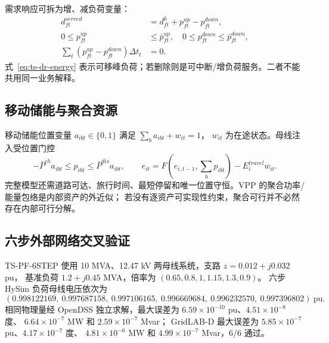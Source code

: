 需求响应可拆为增、减负荷变量：
\begin{align}
d_{ft}^{served}&=d_{ft}^0+p_{ft}^{up}-p_{ft}^{down},\label{eq:ts-dr}\\
0\le p_{ft}^{up}&\le\bar p_{ft}^{up},\quad0\le p_{ft}^{down}\le\bar p_{ft}^{down},\\
\sum_t(p_{ft}^{up}-p_{ft}^{down})\Delta t_t&=0.\label{eq:ts-dr-energy}
\end{align}
式~\eqref{eq:ts-dr-energy} 表示可移峰负荷；若删除则是可中断/增负荷服务。二者不能共用同一业务解释。

\subsection{移动储能与聚合资源}
移动储能位置变量 $a_{ibt}\in\{0,1\}$ 满足 $\sum_ba_{ibt}+w_{it}=1$，
$w_{it}$ 为在途状态。母线注入受位置门控
\begin{equation}
-\bar P^{ch}a_{ibt}\le p_{ibt}\le\bar P^{dis}a_{ibt},\qquad
e_{it}=F(e_{i,t-1},\sum_bp_{ibt})-E_i^{travel}w_{it}.\label{eq:ts-mobile}
\end{equation}
完整模型还需道路可达、旅行时间、最短停留和唯一位置守恒。VPP 的聚合功率/能量包络是内部资产的外近似；
若没有逐资产可实现性约束，聚合可行并不必然存在内部可行分解。

\subsection{六步外部网络交叉验证}
TS-PF-6STEP 使用 10 MVA、12.47 kV 两母线系统，支路 $z=0.012+j0.032$ pu，
基准负荷 $1.2+j0.45$ MVA，倍率为 $(0.65,0.8,1,1.15,1.3,0.9)$。
六步 HySim 负荷母线电压依次为
\begin{equation*}
(0.998122169,\ 0.997687158,\ 0.997106165,\ 0.996669684,\ 0.996232570,\ 0.997396802)\ \mathrm{pu}.
\end{equation*}
相同物理量经 OpenDSS 独立求解，最大误差为
$6.59\times10^{-10}$ pu、$4.51\times10^{-8}$ 度、
$6.64\times10^{-7}$ MW 和 $2.59\times10^{-7}$ Mvar；
GridLAB-D 最大误差为 $5.85\times10^{-7}$ pu、$4.17\times10^{-7}$ 度、
$4.81\times10^{-6}$ MW 和 $4.99\times10^{-7}$ Mvar，6/6 通过。


